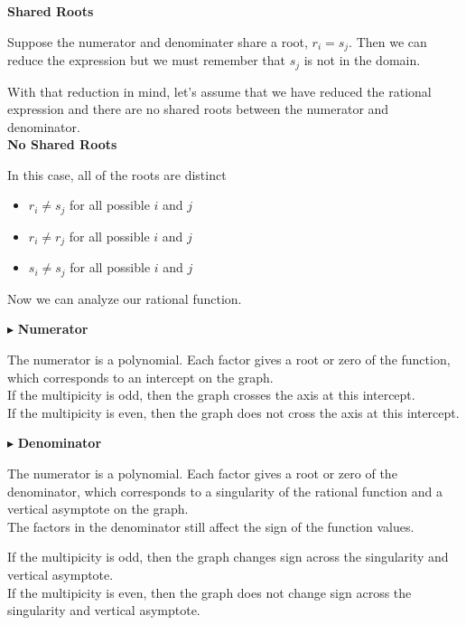 \documentclass{ximera}
\begin{document}
\textbf{Shared Roots}

Suppose the numerator and denominater share a root, $r_i = s_j$.  Then we can reduce the expression but we must remember that $s_j$ is not in the domain.


With that reduction in mind, let's assume that we have reduced the rational expression and there are no shared roots between the numerator and denominator. \\




\textbf{No Shared Roots}

In this case, all of the roots are distinct

\begin{itemize}
\item $r_i \ne s_j$ for all possible $i$ and $j$
\item $r_i \ne r_j$ for all possible $i$ and $j$
\item $s_i \ne s_j$ for all possible $i$ and $j$
\end{itemize}


Now we can analyze our rational function.



$\blacktriangleright$ \textbf{Numerator}



The numerator is a polynomial.  Each factor gives a root or zero of the function, which corresponds to an intercept on the graph. \\

If the multipicity is odd, then the graph crosses the axis at this intercept.  \\
If the multipicity is even, then the graph does not cross the axis at this intercept. 






$\blacktriangleright$ \textbf{Denominator}


The numerator is a polynomial.  Each factor gives a root or zero of the denominator, which corresponds to a singularity of the rational function and a vertical asymptote on the graph. \\


The factors in the denominator still affect the sign of the function values.


If the multipicity is odd, then the graph changes sign across the singularity and vertical asymptote.  \\
If the multipicity is even, then the graph does not change sign across the singularity and vertical asymptote. 
\end{document}
